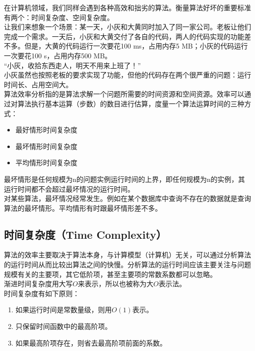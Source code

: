 在计算机领域，我们同样会遇到各种高效和拙劣的算法。衡量算法好坏的重要标准有两个：时间复杂度、空间复杂度。\\

让我们来想象一个场景：某一天，小灰和大黄同时加入了同一家公司。老板让他们完成一个需求。一天后，小灰和大黄交付了各自的代码，两人的代码实现的功能差不多。但是，大黄的代码运行一次要花100 ms，占用内存5 MB；小灰的代码运行一次要花100 s，占用内存500 MB。\\

“小灰，收拾东西走人，明天不用来上班了！”\\

小灰虽然也按照老板的要求实现了功能，但他的代码存在两个很严重的问题：运行时间长、占用空间大。\\

算法效率分析指的是算法求解一个问题所需要的时间资源和空间资源。效率可以通过对算法执行基本运算（步数）的数目进行估算，度量一个算法运算时间的三种方式：

\begin{itemize}
	\item 最好情形时间复杂度
	\item 最坏情形时间复杂度
	\item 平均情形时间复杂度
\end{itemize}

最坏情形是任何规模为n的问题实例运行时间的上界，即任何规模为n的实例，其运行时间都不会超过最坏情况的运行时间。\\

对某些算法，最坏情况经常发生。例如在某个数据库中查询不存在的数据就是查询算法的最坏情形。平均情形有时跟最坏情形差不多。\\

\subsection{时间复杂度（Time Complexity）}

算法的效率主要取决于算法本身，与计算模型（计算机）无关，可以通过分析算法的运行时间从而比较出算法之间的快慢。分析算法的运行时间应该主要关注与问题规模有关的主要项，其它低阶项，甚至主要项的常数系数都可以忽略。\\

渐进时间复杂度用大写$ O $来表示，所以也被称为大$ O $表示法。\\

时间复杂度有如下原则：

\begin{enumerate}
	\item 如果运行时间是常数量级，则用$ O(1) $表示。
	\item 只保留时间函数中的最高阶项。
	\item 如果最高阶项存在，则省去最高阶项前面的系数。
\end{enumerate}

